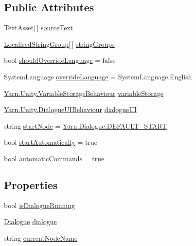 \subsection*{Public Attributes}
\begin{DoxyCompactItemize}
\item 
Text\-Asset\mbox{[}$\,$\mbox{]} \hyperlink{a00071_a71eae33d06990a3aec5d444fae017492}{source\-Text}
\item 
\hyperlink{a00107_d3/db8/a00316}{Localised\-String\-Group}\mbox{[}$\,$\mbox{]} \hyperlink{a00071_a4d00a0671c2966b88d1c806c675fe915}{string\-Groups}
\item 
bool \hyperlink{a00071_a3e093d36845924378a8b2fd9ea3ac73d}{should\-Override\-Language} = false
\item 
System\-Language \hyperlink{a00071_ad12db159fc3df0819d5b594c33fba834}{override\-Language} = System\-Language.\-English
\item 
\hyperlink{a00165}{Yarn.\-Unity.\-Variable\-Storage\-Behaviour} \hyperlink{a00071_a6cca3d33f8b0ce3e750caed9fd8fc734}{variable\-Storage}
\item 
\hyperlink{a00073}{Yarn.\-Unity.\-Dialogue\-U\-I\-Behaviour} \hyperlink{a00071_ac87fdc65b0be57868f80c0fcd62ffd6d}{dialogue\-U\-I}
\item 
string \hyperlink{a00071_a61c92b8d2228d01d8ac123b73bbb41a0}{start\-Node} = \hyperlink{a00070_a1b643f15f734090e6a58cbf13dafd28f}{Yarn.\-Dialogue.\-D\-E\-F\-A\-U\-L\-T\-\_\-\-S\-T\-A\-R\-T}
\item 
bool \hyperlink{a00071_a6476a987f9788dba653976bcbe72980c}{start\-Automatically} = true
\item 
bool \hyperlink{a00071_a6aac5e877d5396a8141da5e85243f462}{automatic\-Commands} = true
\end{DoxyCompactItemize}
\subsection*{Properties}
\begin{DoxyCompactItemize}
\item 
bool \hyperlink{a00071_a9eb0fd7b600a4667595042832af1d655}{is\-Dialogue\-Running}
\item 
\hyperlink{a00070}{Dialogue} \hyperlink{a00071_a4f9712a847ca6d53ec8d2dd64dfcffd8}{dialogue}
\item 
string \hyperlink{a00071_a8589c66769e89906eaff3c2263bdad5d}{current\-Node\-Name}
\end{DoxyCompactItemize}
